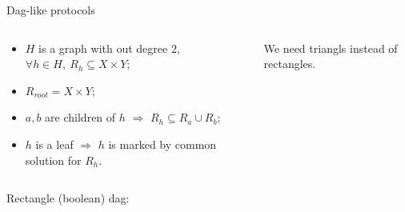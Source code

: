 \begin{frame}{Dag-like protocols}
    \vspace{-0.8cm}
    \begin{columns}[t]
        \begin{column}{0.58\textwidth}
            \begin{itemize}
                \item $H$ is a graph with out degree $2$, $\forall h \in H, ~ R_h \subseteq X \times Y$;
                \item $R_{root} = X \times Y$;
                \item $a, b$ are children of $h$ $\Rightarrow$ $R_{h} \subseteq R_{a} \cup R_{b}$;
                \item $h$ is a leaf $\Rightarrow$ $h$ is marked by common solution for $R_h$.
            \end{itemize}
        \end{column}

		\begin{column}{0.38\textwidth}
            \begin{center}
                
            \end{center}
		\end{column}

        We need \alert{triangls} instead of rectangles.
	\end{columns}

    \pause
    \begin{center}
        Rectangle (boolean) dag:
        
        \vspace{0.2cm}
        
    \end{center}

\end{frame}

